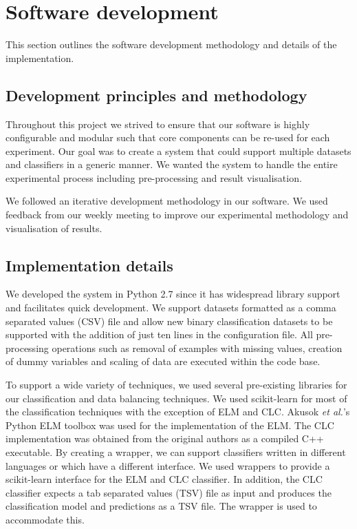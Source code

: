 \documentclass{sig-alternate-05-2015}
\begin{document}
	\section{Software development}
	This section outlines the software development methodology and details of the implementation.
	\subsection{Development principles and methodology}
	Throughout this project we strived to ensure that our software is highly configurable and modular such that core components can be re-used for each experiment. Our goal was to create a system that could support multiple datasets and classifiers in a generic manner. We wanted the system to handle the entire experimental process including pre-processing and result visualisation.
	
	We followed an iterative development methodology in our software. We used feedback from our weekly meeting to improve our experimental methodology and visualisation of results.
	
	\subsection{Implementation details}
	We developed the system in Python 2.7 since it has widespread library support and facilitates quick development. We support datasets formatted as a comma separated values (CSV) file and allow new binary classification datasets to be supported with the addition of just ten lines in the configuration file. All pre-processing operations such as removal of examples with missing values, creation of dummy variables and scaling of data are executed within the code base.
	
	To support a wide variety of techniques, we used several pre-existing libraries for our classification and data balancing techniques. We used scikit-learn \cite{scikit-learn} for most of the classification techniques with the exception of ELM and CLC. Akusok \textit{et al.}'s \cite{7140733} Python ELM toolbox was used for the implementation of the ELM. The CLC implementation was obtained from the original authors \cite{Chen2006} as a compiled C++ executable. By creating a wrapper, we can support classifiers written in different languages or which have a different interface. We used wrappers to provide a scikit-learn interface for the ELM and CLC classifier. In addition, the CLC classifier expects a tab separated values (TSV) file as input and produces the classification model and predictions as a TSV file. The wrapper is used to accommodate this.
	
\end{document}
